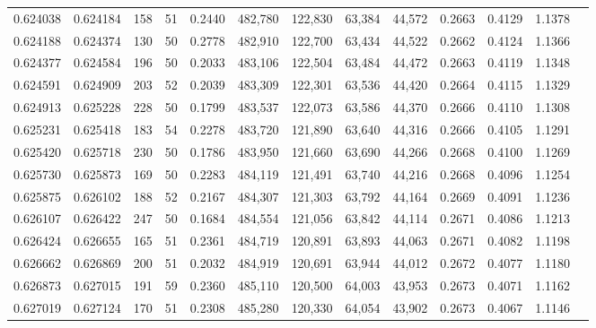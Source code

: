 \begin{tabular}{rrrrrrrrrrrrr}
0.624038 & 0.624184 &   158 &  51 &                                     0.2440 & 482,780 & 122,830 &  63,384 &  44,572 & 0.2663 & 0.4129 & 1.1378 \\
0.624188 & 0.624374 &   130 &  50 &                                     0.2778 & 482,910 & 122,700 &  63,434 &  44,522 & 0.2662 & 0.4124 & 1.1366 \\
0.624377 & 0.624584 &   196 &  50 &                                     0.2033 & 483,106 & 122,504 &  63,484 &  44,472 & 0.2663 & 0.4119 & 1.1348 \\
0.624591 & 0.624909 &   203 &  52 &                                     0.2039 & 483,309 & 122,301 &  63,536 &  44,420 & 0.2664 & 0.4115 & 1.1329 \\
0.624913 & 0.625228 &   228 &  50 &                                     0.1799 & 483,537 & 122,073 &  63,586 &  44,370 & 0.2666 & 0.4110 & 1.1308 \\
0.625231 & 0.625418 &   183 &  54 &                                     0.2278 & 483,720 & 121,890 &  63,640 &  44,316 & 0.2666 & 0.4105 & 1.1291 \\
0.625420 & 0.625718 &   230 &  50 &                                     0.1786 & 483,950 & 121,660 &  63,690 &  44,266 & 0.2668 & 0.4100 & 1.1269 \\
0.625730 & 0.625873 &   169 &  50 &                                     0.2283 & 484,119 & 121,491 &  63,740 &  44,216 & 0.2668 & 0.4096 & 1.1254 \\
0.625875 & 0.626102 &   188 &  52 &                                     0.2167 & 484,307 & 121,303 &  63,792 &  44,164 & 0.2669 & 0.4091 & 1.1236 \\
0.626107 & 0.626422 &   247 &  50 &                                     0.1684 & 484,554 & 121,056 &  63,842 &  44,114 & 0.2671 & 0.4086 & 1.1213 \\
0.626424 & 0.626655 &   165 &  51 &                                     0.2361 & 484,719 & 120,891 &  63,893 &  44,063 & 0.2671 & 0.4082 & 1.1198 \\
0.626662 & 0.626869 &   200 &  51 &                                     0.2032 & 484,919 & 120,691 &  63,944 &  44,012 & 0.2672 & 0.4077 & 1.1180 \\
0.626873 & 0.627015 &   191 &  59 &                                     0.2360 & 485,110 & 120,500 &  64,003 &  43,953 & 0.2673 & 0.4071 & 1.1162 \\
0.627019 & 0.627124 &   170 &  51 &                                     0.2308 & 485,280 & 120,330 &  64,054 &  43,902 & 0.2673 & 0.4067 & 1.1146 \\

\end{tabular}
